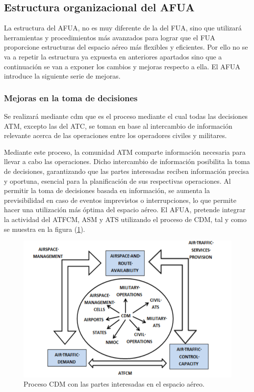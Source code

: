 \subsection{Estructura organizacional del AFUA}

La estructura del AFUA, no es muy diferente de la del FUA, sino que utilizará herramientas y procedimientos más avanzados para lograr que el FUA proporcione estructuras del espacio aéreo más flexibles y eficientes. Por ello no se va a repetir la estructura ya expuesta en anteriores apartados sino que a continuación se van a exponer los cambios y mejoras respecto a ella. El AFUA introduce la siguiente serie de mejoras.

\subsubsection{Mejoras en la toma de decisiones}

Se realizará mediante \acrfull{cdm} que es el proceso mediante el cual todas las decisiones ATM, excepto las del ATC, se toman en base al intercambio de información relevante acerca de las operaciones entre los operadores civiles y militares.  

Mediante este proceso, la comunidad ATM comparte información necesaria para llevar a cabo las operaciones. Dicho intercambio de información posibilita la toma de decisiones, garantizando que las partes interesadas reciben información precisa y oportuna, esencial para la planificación de sus respectivas operaciones. Al permitir la toma de decisiones basada en información, se aumenta la previsibilidad en caso de eventos imprevistos o interrupciones, lo que permite hacer una utilización más óptima del espacio aéreo. El AFUA, pretende integrar la actividad del ATFCM, ASM y ATS utilizando el proceso de CDM, tal y como se muestra en la figura (\ref{fig:cdm}).

\begin{figure}[H]
    \centering
    \includegraphics[width=1\linewidth]{figuras/cdm.png}
    \caption{Proceso CDM con las partes interesadas en el espacio aéreo.}
    \label{fig:cdm}
\end{figure}

